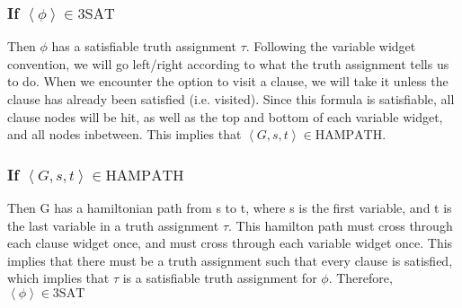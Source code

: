 \subsubsection{If $\left<\phi\right>\in\text{3SAT}$}

Then $\phi$ has a satisfiable truth assignment $\tau$. Following the variable widget convention, we will go left/right according to what the truth assignment tells us to do. When we encounter the option to visit a clause, we will take it unless the clause has already been satisfied (i.e. visited). Since this formula is satisfiable, all clause nodes will be hit, as well as the top and bottom of each variable widget, and all nodes inbetween. This implies that $\left<G,s,t\right>\in\text{HAMPATH}$.

\subsubsection{If $\left<G,s,t\right>\in\text{HAMPATH}$}

Then G has a hamiltonian path from s to t, where s is the first variable, and t is the last variable in a truth assignment $\tau$. This hamilton path must cross through each clause widget once, and must cross through each variable widget once. This implies that there must be a truth assignment such that every clause is satisfied, which implies that $\tau$ is a satisfiable truth assignment for $\phi$. Therefore, $\left<\phi\right>\in\text{3SAT}$
